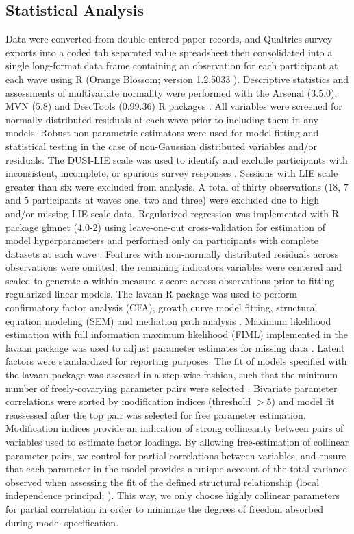 \documentclass[utf8]{article}
\begin{document}
\subsection*{Statistical Analysis}
Data were converted from double-entered paper records, and Qualtrics survey exports into a coded tab separated value spreadsheet then consolidated into a single long-format data frame containing an observation for each participant at each wave using R (Orange Blossom; version 1.2.5033 \cite{R}). Descriptive statistics and assessments of multivariate normality were performed with the Arsenal (3.5.0), MVN (5.8) and DescTools (0.99.36) R packages \citep{MVN,DescTools}. All variables were screened for normally distributed residuals at each wave prior to including them in any models. Robust non-parametric estimators were used for model fitting and statistical testing in the case of non-Gaussian distributed variables and/or residuals. The DUSI-LIE scale was used to identify and exclude participants with inconsistent, incomplete, or spurious survey responses \citep{dalla2003effects}. Sessions with LIE scale greater than six were excluded from analysis. A total of thirty observations ($18$, $7$ and $5$ participants at waves one, two and three) were excluded due to high and/or missing LIE scale data. Regularized regression was implemented with R package glmnet (4.0-2) using leave-one-out cross-validation for estimation of model hyperparameters and performed only on participants with complete datasets at each wave \citep{friedman2009glmnet, FriedmanHastieTibshirani2010}. Features with non-normally distributed residuals across observations were omitted; the remaining indicators variables were centered and scaled to generate a within-measure z-score across observations prior to fitting regularized linear models. The lavaan R package was used to perform confirmatory factor analysis (CFA), growth curve model fitting, structural equation modeling (SEM) and mediation path analysis \citep{Lavaan}. Maximum likelihood estimation with full information maximum likelihood (FIML) implemented in the lavaan package was used to adjust parameter estimates for missing data \citep{cham2017full}. Latent factors were standardized for reporting purposes. The fit of models specified with the lavaan package was assessed in a step-wise fashion, such that the minimum number of freely-covarying parameter pairs were selected \citep{schreiber2006reporting}. Bivariate parameter correlations were sorted by modification indices (threshold $>5$) and model fit reassessed after the top pair was selected for free parameter estimation. Modification indices provide an indication of strong collinearity between pairs of variables used to estimate factor loadings. By allowing free-estimation of collinear parameter pairs, we control for partial correlations between variables, and ensure that each parameter in the model provides a unique account of the total variance observed when assessing the fit of the defined structural relationship (local independence principal; \cite{sobel1997measurement}). This way, we only choose highly collinear parameters for partial correlation in order to minimize the degrees of freedom absorbed during model specification. 
\end{document}
